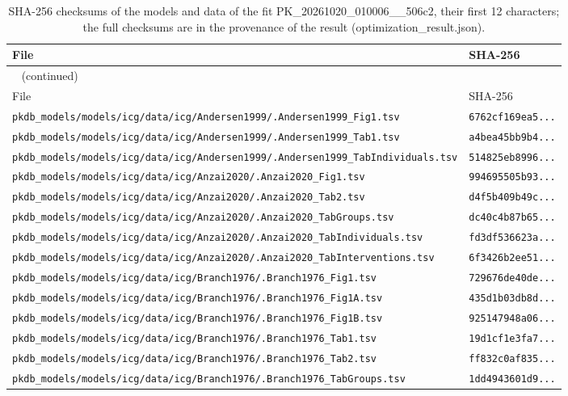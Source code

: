 \documentclass{article}
\begin{document}
\begin{longtable}{ll}
\caption{SHA-256 checksums of the models and data of the fit PK\_20261020\_010006\_\_506c2, their first 12 characters; the full checksums are in the provenance of the result (optimization\_result.json).}\label{tab:checksums:PK_20261020_010006__506c2} \\
\toprule
File & SHA-256 \\
\midrule
\endfirsthead
\multicolumn{2}{l}{\small\tablename~\thetable{} (continued)} \\
\toprule
File & SHA-256 \\
\midrule
\endhead
\bottomrule
\endlastfoot
\texttt{pkdb\_models/models/icg/data/icg/Andersen1999/.Andersen1999\_Fig1.tsv} & \texttt{6762cf169ea5...} \\
\texttt{pkdb\_models/models/icg/data/icg/Andersen1999/.Andersen1999\_Tab1.tsv} & \texttt{a4bea45bb9b4...} \\
\texttt{pkdb\_models/models/icg/data/icg/Andersen1999/.Andersen1999\_TabIndividuals.tsv} & \texttt{514825eb8996...} \\
\texttt{pkdb\_models/models/icg/data/icg/Anzai2020/.Anzai2020\_Fig1.tsv} & \texttt{994695505b93...} \\
\texttt{pkdb\_models/models/icg/data/icg/Anzai2020/.Anzai2020\_Tab2.tsv} & \texttt{d4f5b409b49c...} \\
\texttt{pkdb\_models/models/icg/data/icg/Anzai2020/.Anzai2020\_TabGroups.tsv} & \texttt{dc40c4b87b65...} \\
\texttt{pkdb\_models/models/icg/data/icg/Anzai2020/.Anzai2020\_TabIndividuals.tsv} & \texttt{fd3df536623a...} \\
\texttt{pkdb\_models/models/icg/data/icg/Anzai2020/.Anzai2020\_TabInterventions.tsv} & \texttt{6f3426b2ee51...} \\
\texttt{pkdb\_models/models/icg/data/icg/Branch1976/.Branch1976\_Fig1.tsv} & \texttt{729676de40de...} \\
\texttt{pkdb\_models/models/icg/data/icg/Branch1976/.Branch1976\_Fig1A.tsv} & \texttt{435d1b03db8d...} \\
\texttt{pkdb\_models/models/icg/data/icg/Branch1976/.Branch1976\_Fig1B.tsv} & \texttt{925147948a06...} \\
\texttt{pkdb\_models/models/icg/data/icg/Branch1976/.Branch1976\_Tab1.tsv} & \texttt{19d1cf1e3fa7...} \\
\texttt{pkdb\_models/models/icg/data/icg/Branch1976/.Branch1976\_Tab2.tsv} & \texttt{ff832c0af835...} \\
\texttt{pkdb\_models/models/icg/data/icg/Branch1976/.Branch1976\_TabGroups.tsv} & \texttt{1dd4943601d9...} \\

\end{longtable}
\end{document}

